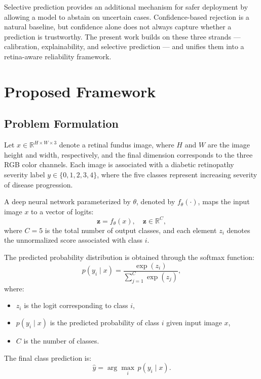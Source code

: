 \documentclass[conference]{IEEEtran}
\begin{document}
Selective prediction provides an additional mechanism for safer deployment by allowing a model to abstain on uncertain cases. Confidence-based rejection is a natural baseline, but confidence alone does not always capture whether a prediction is trustworthy. The present work builds on these three strands --- calibration, explainability, and selective prediction --- and unifies them into a retina-aware reliability framework.

\section{Proposed Framework}

\subsection{Problem Formulation}
Let $x \in \mathbb{R}^{H \times W \times 3}$ denote a retinal fundus image, where $H$ and $W$ are the image height and width, respectively, and the final dimension corresponds to the three RGB color channels. Each image is associated with a diabetic retinopathy severity label $y \in \{0,1,2,3,4\}$, where the five classes represent increasing severity of disease progression.

A deep neural network parameterized by $\theta$, denoted by $f_\theta(\cdot)$, maps the input image $x$ to a vector of logits:
\begin{equation}
\mathbf{z} = f_\theta(x), \quad \mathbf{z} \in \mathbb{R}^{C},
\end{equation}
where $C=5$ is the total number of output classes, and each element $z_i$ denotes the unnormalized score associated with class $i$.

The predicted probability distribution is obtained through the softmax function:
\begin{equation}
p(y_i \mid x) = \frac{\exp(z_i)}{\sum_{j=1}^{C}\exp(z_j)},
\end{equation}
where:
\begin{itemize}
    \item $z_i$ is the logit corresponding to class $i$,
    \item $p(y_i \mid x)$ is the predicted probability of class $i$ given input image $x$,
    \item $C$ is the number of classes.
\end{itemize}

The final class prediction is:
\begin{equation}
\hat{y} = \arg\max_i \, p(y_i \mid x).
\end{equation}
\end{document}
